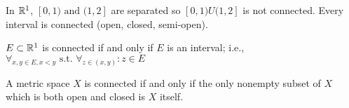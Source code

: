 \begin{example}
	In $\mathbb{R}^{1}$, $[0,1) \text{ and }  (1,2]$ are separated so $[0,1) U (1,2]$ is not connected. Every interval is connected (open, closed, semi-open).
\end{example}

\begin{theorem}
	\label{2.37}
	$E \subset \mathbb{R}^{1}$ is connected if and only if $E$ is an interval; i.e., $\forall_{x,y \in E,x<y} \text{ s.t. }  \forall_{z \in (x,y)}:z \in E $
\end{theorem}

\begin{theorem}
	A metric space $X$ is connected if and only if the only nonempty subset of $X$ which is both open and closed is $X$ itself.
\end{theorem}


